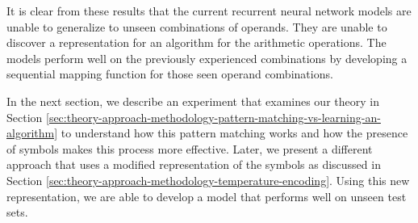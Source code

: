 It is clear from these results that the current recurrent neural network models are unable to generalize to unseen combinations of operands. They are unable to discover a representation for an algorithm for the arithmetic operations. The models perform well on the previously experienced combinations by developing a sequential mapping function for those seen operand combinations.

In the next section, we describe an experiment that examines our theory in Section \ref{sec:theory-approach-methodology-pattern-matching-vs-learning-an-algorithm} to understand how this pattern matching works and how the presence of symbols makes this process more effective. Later, we present a different approach that uses a modified representation of the symbols as discussed in Section \ref{sec:theory-approach-methodology-temperature-encoding}. Using this new representation, we are able to develop a model that performs well on unseen test sets.